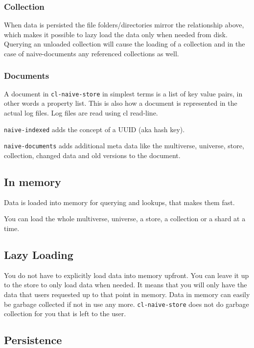 \documentclass[11pt]{article}
\begin{document}
\subsubsection{Collection}
\label{sec:orgac5363c}

When data is persisted the file folders/directories mirror the
relationship above, which makes it possible to lazy load the data only
when needed from disk. Querying an unloaded collection will cause the
loading of a collection and in the case of naive-documents any
referenced collections as well.

\subsubsection{Documents}
\label{sec:orgb6b3b5e}

A document in \texttt{cl-naive-store} in simplest terms is a list of key
value pairs, in other words a property list. This is also how a
document is represented in the actual log files. Log files are read
using cl read-line.

\texttt{naive-indexed} adds the concept of a UUID (aka hash key).

\texttt{naive-documents} adds additional meta data like the multiverse,
universe, store, collection, changed data and old versions to the
document.

\subsection{In memory}
\label{sec:org32c8bcc}

Data is loaded into memory for querying and lookups, that makes them
fast.

You can load the whole multiverse, universe, a store, a collection or a shard at a
time.

\subsection{Lazy Loading}
\label{sec:orgb48b9a1}

You do not have to explicitly load data into memory upfront. You can
leave it up to the store to only load data when needed. It means that
you will only have the data that users requested up to that point in
memory. Data in memory can easily be garbage collected if not in use
any more. \texttt{cl-naive-store} does not do garbage collection for you that
is left to the user.

\subsection{Persistence}
\label{sec:orga90bc66}
\end{document}
